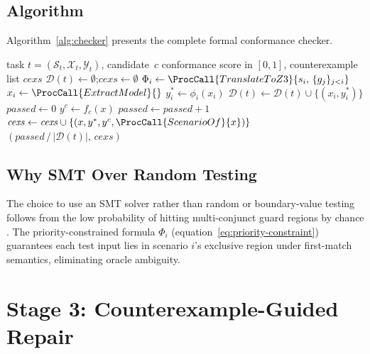 \subsection{Algorithm}
\label{subsec:method:checker-alg}

Algorithm~\ref{alg:checker} presents the complete formal conformance checker.

\begin{algorithm}[t]
\caption{SMT-Driven Formal Conformance Checking}
\label{alg:checker}
\begin{algorithmic}[1]
\Require task $t = (\mathcal{S}_t, \mathcal{X}_t, \mathcal{Y}_t)$, candidate~$c$
\Ensure conformance score in $[0,1]$, counterexample list $\mathit{cexs}$
\State $\mathcal{D}(t) \leftarrow \emptyset$;\quad $\mathit{cexs} \leftarrow \emptyset$
  \State $\Phi_i \leftarrow \ProcCall{TranslateToZ3}{s_i,\, \{g_j\}_{j<i}}$
    \State $x_i \leftarrow \ProcCall{ExtractModel}{}$
    \State $y_i^* \leftarrow \phi_i(x_i)$
    \State $\mathcal{D}(t) \leftarrow \mathcal{D}(t) \cup \{(x_i, y_i^*)\}$
  \EndIf
\EndFor
\State $\mathit{passed} \leftarrow 0$
  \State $y^c \leftarrow f_c(x)$
    \State $\mathit{passed} \leftarrow \mathit{passed} + 1$
  \Else
    \State $\mathit{cexs} \leftarrow \mathit{cexs} \cup
           \{(x, y^*, y^c, \ProcCall{ScenarioOf}{x})\}$
  \EndIf
\EndFor
\State \Return $(\mathit{passed}\,/\,|\mathcal{D}(t)|,\,\mathit{cexs})$
\end{algorithmic}
\end{algorithm}

\subsection{Why SMT Over Random Testing}
\label{subsec:method:smt-rationale}

The choice to use an SMT solver rather than random or boundary-value testing
follows from the low probability of hitting multi-conjunct guard regions by
chance \citep{claessen2000quickcheck, zhu1997specification}.
The priority-constrained formula $\Phi_i$ (equation~\eqref{eq:priority-constraint})
guarantees each test input lies in scenario $i$'s exclusive region under
first-match semantics, eliminating oracle ambiguity.

\section{Stage 3: Counterexample-Guided Repair}
\label{sec:method:repair}

